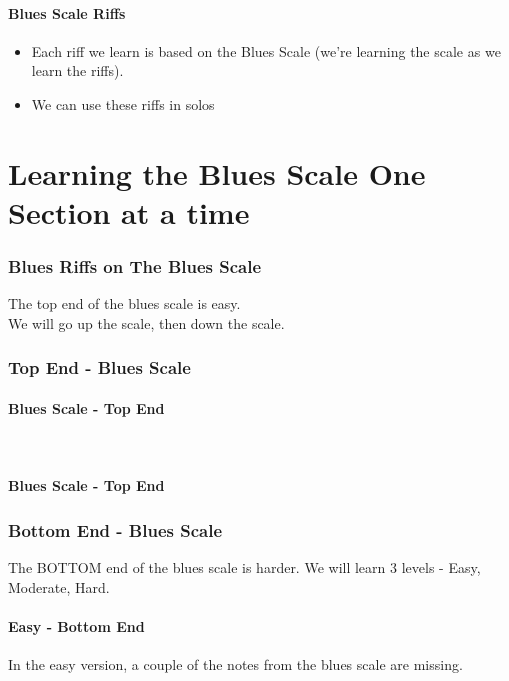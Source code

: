     \subsection{Blues Scale Riffs}
        \begin{itemize}
            \item Each riff we learn is based on the Blues Scale (we're learning the scale as we learn the riffs).
            \item We can use these riffs in solos
        \end{itemize}

\part{Learning the Blues Scale One Section at a time}
    \section{Blues Riffs on The Blues Scale}
    The top end of the blues scale is easy. 
    \\ We will go up the scale, then down the scale. \Uparrow \Downarrow
        \section*{Top End - Blues Scale}
            \subsection*{Blues Scale - Top End \Uparrow}
                \4\5\6\\
                
            \subsection*{Blues Scale - Top End \Downarrow}
                \6\5\4 
                
\newpage    
        \section*{Bottom End - Blues Scale}
        The BOTTOM end of the blues scale is harder. We will learn 3 levels - Easy, Moderate, Hard.
            \subsection*{Easy - Bottom End}
            In the easy version, a couple of the notes from the blues scale are missing.
                
